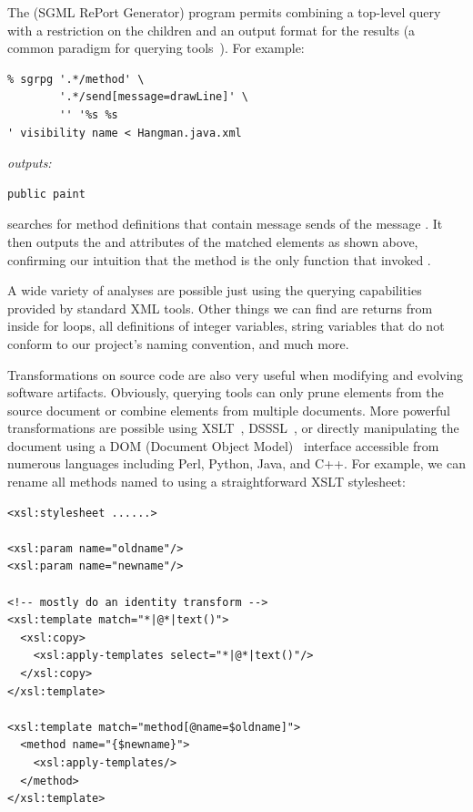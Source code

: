 \documentclass{article}
\begin{document}
\begin{multicols}{2}
The  (SGML RePort Generator) program permits combining a
top-level query with a restriction on the children and an output format
for the results (a common paradigm for querying tools~\cite{XMLQL-EnE}).
For example:

{\small
\begin{verbatim}
% sgrpg '.*/method' \
        '.*/send[message=drawLine]' \
        '' '%s %s 
' visibility name < Hangman.java.xml
\end{verbatim}

\noindent\emph{outputs:}
\begin{verbatim}
public paint
\end{verbatim}
}

\noindent searches for method definitions that contain message sends of the
message \smtexttt{hasMoreElements}.  It then outputs the
 and  attributes of the matched
elements as shown above, confirming our intuition that the
 method is the only function that invoked .

A wide variety of analyses are possible just using the querying
capabilities provided by standard XML tools.  Other things we can find
are returns from inside for loops, all definitions of integer variables,
string variables that do not conform to our project's naming convention,
and much more.

Transformations on source code are also very useful when modifying and
evolving software artifacts.  Obviously, querying tools can only prune
elements from the source document or combine elements from multiple
documents.  More powerful transformations are possible using
XSLT~\cite{XSLT}, DSSSL~\cite{DSSSL}, or directly manipulating the
document using a DOM (Document Object Model)~\cite{DOM} interface
accessible from numerous languages including Perl, Python, Java, and
C++.  For example, we can rename all methods named \smtexttt{isBall} to
\smtexttt{FIsBall} using a straightforward XSLT stylesheet:

{ \small
\begin{verbatim}
<xsl:stylesheet ......>

<xsl:param name="oldname"/>
<xsl:param name="newname"/>

<!-- mostly do an identity transform -->
<xsl:template match="*|@*|text()">
  <xsl:copy>
    <xsl:apply-templates select="*|@*|text()"/>
  </xsl:copy>
</xsl:template>

<xsl:template match="method[@name=$oldname]">
  <method name="{$newname}">
    <xsl:apply-templates/>
  </method>
</xsl:template>


\end{verbatim}}
\end{multicols}
\end{document}
